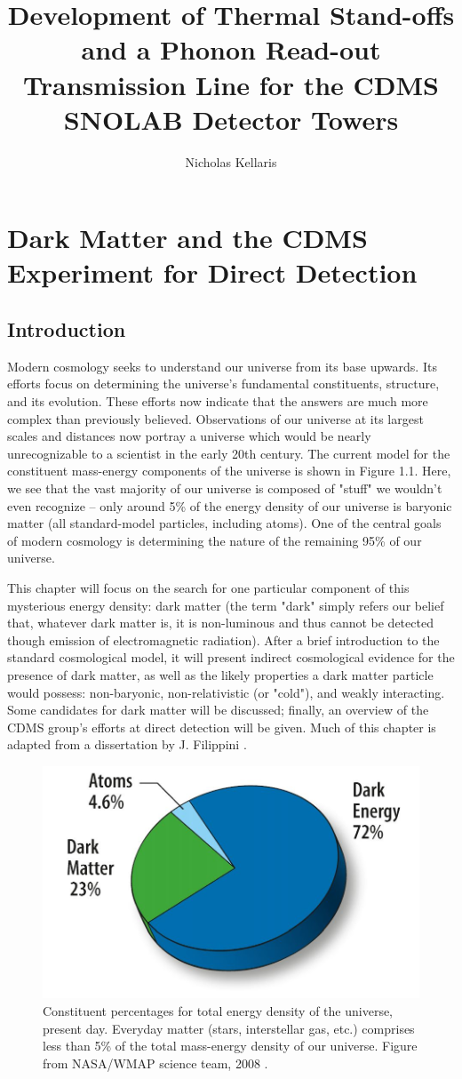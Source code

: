 \documentclass{report}
\title{Development of Thermal Stand-offs and a Phonon Read-out Transmission Line for the CDMS SNOLAB Detector Towers}
\author{Nicholas Kellaris}
\begin{document}

\maketitle

\chapter{Dark Matter and the CDMS Experiment for Direct Detection}

\section{Introduction}

Modern cosmology seeks to understand our universe from its base upwards. Its efforts focus on determining the universe's fundamental constituents, structure, and its evolution. These efforts now indicate that the answers are much more complex than previously believed. Observations of our universe at its largest scales and distances now portray a universe which would be nearly unrecognizable to a scientist in the early 20th century. The current model for the constituent mass-energy components of the universe is shown in Figure 1.1. Here, we see that the vast majority of our universe is composed of "stuff" we wouldn't even recognize -- only around 5\% of the energy density of our universe is baryonic matter (all standard-model particles, including atoms). One of the central goals of modern cosmology is determining the nature of the remaining 95\% of our universe.

This chapter will focus on the search for one particular component of this mysterious energy density: dark matter (the term "dark" simply refers our belief that, whatever dark matter is, it is non-luminous and thus cannot be detected though emission of electromagnetic radiation). After a brief introduction to the standard cosmological model, it will present indirect cosmological evidence for the presence of dark matter, as well as the likely properties a dark matter particle would possess: non-baryonic, non-relativistic (or "cold"), and weakly interacting. Some candidates for dark matter will be discussed; finally, an overview of the CDMS group's efforts at direct detection will be given. Much of this chapter is adapted from a dissertation by J. Filippini \cite{Filippini2008}.

\begin{figure}[h]
\centering
\includegraphics[width = .4\textwidth]{Pie_chart_universe.jpg}
\caption{Constituent percentages for total energy density of the universe, present day. Everyday matter (stars, interstellar gas, etc.) comprises less than 5\% of the total mass-energy density of our universe. Figure from NASA/WMAP science team, 2008 \cite{WMAP}.}
\end{figure}
\end{document}
